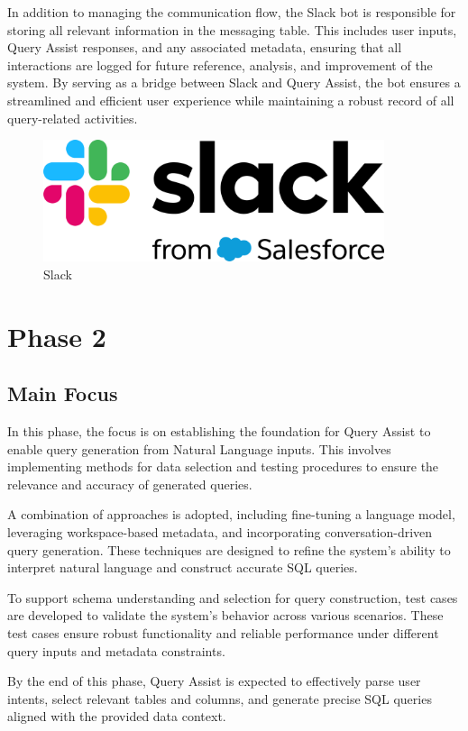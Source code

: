     In addition to managing the communication flow, the Slack bot is responsible for storing all relevant information in the messaging table. This includes user inputs, Query Assist responses, and any associated metadata, ensuring that all interactions are logged for future reference, analysis, and improvement of the system. By serving as a bridge between Slack and Query Assist, the bot ensures a streamlined and efficient user experience while maintaining a robust record of all query-related activities.
    \begin{figure}[H]
        \centering
        \includegraphics[width=10cm]{chapters/3/figures/SLA-Slack-from-Salesforce-logo.png}
        \caption[Slack]{Slack}
        \label{fig:slack-logo}
    \end{figure}
\section{Phase 2}
    \subsection{Main Focus}
    In this phase, the focus is on establishing the foundation for Query Assist to enable query generation from Natural Language inputs. This involves implementing methods for data selection and testing procedures to ensure the relevance and accuracy of generated queries.

    A combination of approaches is adopted, including fine-tuning a language model, leveraging workspace-based metadata, and incorporating conversation-driven query generation. These techniques are designed to refine the system's ability to interpret natural language and construct accurate SQL queries.

    To support schema understanding and selection for query construction, test cases are developed to validate the system's behavior across various scenarios. These test cases ensure robust functionality and reliable performance under different query inputs and metadata constraints.

    By the end of this phase, Query Assist is expected to effectively parse user intents, select relevant tables and columns, and generate precise SQL queries aligned with the provided data context.

